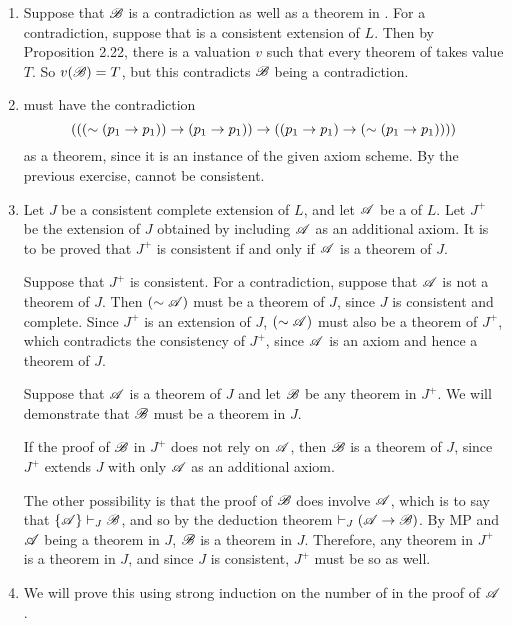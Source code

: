 \begin{enumerate}
  \item %
    Suppose that \(\mathscr{B}\) is a contradiction as well as a theorem in \Lp{}. For a contradiction, suppose that \Lp{} is a consistent extension of \(L\). Then by Proposition 2.22, there is a valuation \(v\) such that every theorem of \Lext{} takes value \(T\). So \(v(\mathscr{B}) = T\), but this contradicts \(\mathscr{B}\) being a contradiction.


  \item %
    \Lpp{} must have the contradiction
    \[(((\sim(p_1 \rightarrow p_1)) \rightarrow (p_1 \rightarrow p_1)) \rightarrow ((p_1 \rightarrow p_1) \rightarrow (\sim (p_1 \rightarrow p_1))))\]
    as a theorem, since it is an instance of the given axiom scheme. By the previous exercise, \Lpp{} cannot be consistent.

  \item %
    Let \(J\) be a consistent complete extension of \(L\), and let \(\mathscr{A}\) be a \wf{} of \(L\). Let \(J^+\) be the extension of \(J\) obtained by including \(\mathscr{A}\) as an additional axiom. It is to be proved that \(J^+\) is consistent if and only if \(\mathscr{A}\) is a theorem of \(J\).

    \Ra{} Suppose that \(J^+\) is consistent. For a contradiction, suppose that \(\mathscr{A}\) is not a theorem of \(J\). Then \((\sim\mathscr{A})\) must be a theorem of \(J\), since \(J\) is consistent and complete. Since \(J^+\) is an extension of \(J\), \((\sim\mathscr{A})\) must also be a theorem of \(J^+\), which contradicts the consistency of \(J^+\), since \(\mathscr{A}\) is an axiom and hence a theorem of \(J\).

    \La{} Suppose that \(\mathscr{A}\) is a theorem of \(J\) and let \(\mathscr{B}\) be any theorem in \(J^+\). We will demonstrate that \(\mathscr{B}\) must be a theorem in \(J\).

    If the proof of \(\mathscr{B}\) in \(J^+\) does not rely on \(\mathscr{A}\), then \(\mathscr{B}\) is a theorem of \(J\), since \(J^+\) extends \(J\) with only \(\mathscr{A}\) as an additional axiom.

    The other possibility is that the proof of \(\mathscr{B}\) does involve \(\mathscr{A}\), which is to say that \(\{\mathscr{A}\} \vdash_{J} \mathscr{B}\), and so by the deduction theorem \(\vdash_{J} (\mathscr{A} \rightarrow \mathscr{B})\). By MP and \(\mathscr{A}\) being a theorem in \(J\), \(\mathscr{B}\) is a theorem in \(J\). Therefore, any theorem in \(J^+\) is a theorem in \(J\), and since \(J\) is consistent, \(J^+\) must be so as well.

  \item %
    We will prove this using strong induction on the number of \wfs{} in the proof of \(\mathscr{A}\).


\end{enumerate}
